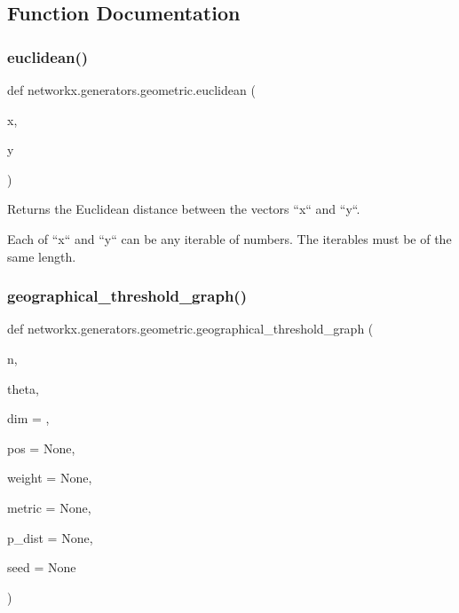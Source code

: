 \subsection{Function Documentation}
\mbox{\label{namespacenetworkx_1_1generators_1_1geometric_af251647619091b18e2f1042d974e6b29}} 
\subsubsection{\texorpdfstring{euclidean()}{euclidean()}}
{\footnotesize\ttfamily def networkx.\+generators.\+geometric.\+euclidean (\begin{DoxyParamCaption}\item[{}]{x,  }\item[{}]{y }\end{DoxyParamCaption})}

\begin{DoxyVerb}Returns the Euclidean distance between the vectors ``x`` and ``y``.

Each of ``x`` and ``y`` can be any iterable of numbers. The
iterables must be of the same length.\end{DoxyVerb}
 \mbox{\label{namespacenetworkx_1_1generators_1_1geometric_ab0b2aa9a0067889b2dee22782d49ab28}} 
\subsubsection{\texorpdfstring{geographical\+\_\+threshold\+\_\+graph()}{geographical\_threshold\_graph()}}
{\footnotesize\ttfamily def networkx.\+generators.\+geometric.\+geographical\+\_\+threshold\+\_\+graph (\begin{DoxyParamCaption}\item[{}]{n,  }\item[{}]{theta,  }\item[{}]{dim = {},  }\item[{}]{pos = {\ttfamily None},  }\item[{}]{weight = {\ttfamily None},  }\item[{}]{metric = {\ttfamily None},  }\item[{}]{p\+\_\+dist = {\ttfamily None},  }\item[{}]{seed = {\ttfamily None} }\end{DoxyParamCaption})}

